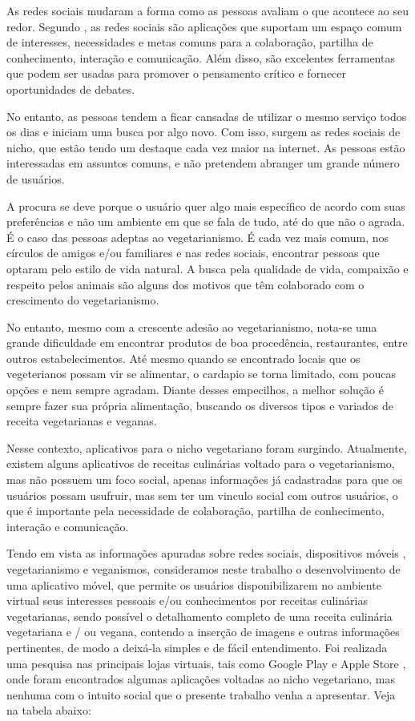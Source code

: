 As redes sociais mudaram a forma como as pessoas avaliam o que acontece ao seu redor. Segundo \citeauthor{patricio-utilizacao}, as redes sociais são aplicações que suportam um espaço comum de interesses, necessidades e metas comuns para a colaboração, partilha de conhecimento, interação e comunicação. Além disso, são excelentes ferramentas que podem ser usadas para promover o pensamento crítico e fornecer oportunidades de debates.

No entanto, as pessoas tendem a ficar cansadas de utilizar o mesmo serviço todos os dias e iniciam uma busca por algo novo. Com isso, surgem as redes sociais de nicho, que estão tendo um destaque cada vez maior na internet. As pessoas estão interessadas em assuntos comuns, e não pretendem abranger um grande número de usuários. 

A procura se deve porque o usuário quer algo mais específico de acordo com suas preferências e não um ambiente em que se fala de tudo, até do que não o agrada. É o caso das pessoas adeptas ao vegetarianismo. É cada vez mais comum, nos círculos de amigos e/ou familiares e nas redes sociais, encontrar pessoas que optaram pelo estilo de vida natural. A busca pela qualidade de vida, compaixão e respeito pelos animais são alguns dos motivos que têm colaborado com o crescimento do vegetarianismo.

No entanto, mesmo com a crescente adesão ao vegetarianismo, nota-se uma grande dificuldade em encontrar produtos de boa procedência, restaurantes, entre outros estabelecimentos. Até mesmo quando se encontrado locais que os vegeterianos possam vir se alimentar, o cardapio se torna limitado, com poucas opções e nem sempre agradam. Diante desses empecilhos, a melhor solução é sempre fazer sua própria alimentação, buscando os diversos tipos e variados de receita vegetarianas e veganas.

Nesse contexto, aplicativos para o nicho vegetariano foram surgindo. Atualmente,  existem alguns aplicativos de receitas culinárias voltado para o vegetarianismo, mas não possuem um foco social, apenas informações já cadastradas para que os usuários possam usufruir, mas sem ter um vinculo social com outros usuários, o que é importante pela necessidade de colaboração, partilha de conhecimento, interação e comunicação.

Tendo em vista as informações apuradas sobre redes sociais, dispositivos móveis , vegetarianismo e veganismos, consideramos neste trabalho o desenvolvimento de uma aplicativo móvel, que permite os usuários disponibilizarem no ambiente virtual seus interesses pessoais e/ou conhecimentos por receitas culinárias vegetarianas, sendo possível o detalhamento completo de uma receita culinária vegetariana e / ou vegana, contendo a inserção de imagens e outras informações pertinentes, de modo a deixá-la simples e de fácil entendimento. Foi realizada uma pesquisa nas principais lojas virtuais, tais como Google Play e Apple Store , onde foram encontrados algumas aplicações voltadas ao nicho vegetariano, mas nenhuma com o intuito social que o presente trabalho venha a apresentar. Veja na tabela abaixo:

